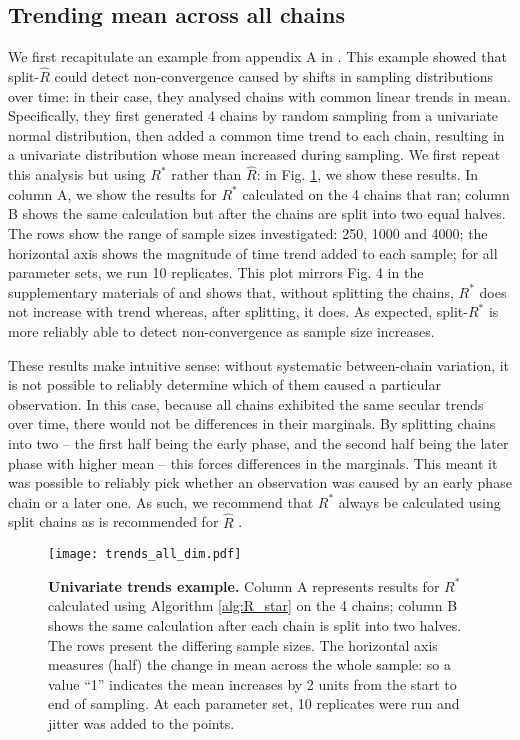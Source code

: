 \documentclass{article}
\begin{document}
\subsection{Trending mean across all chains}\label{sec:non-stationary_chains}
We first recapitulate an example from appendix A in \cite{vehtari2019rank}. This example showed that split-$\widehat{R}$ could detect non-convergence caused by shifts in sampling distributions over time: in their case, they analysed chains with common linear trends in mean. Specifically, they first generated 4 chains by random sampling from a univariate normal distribution, then added a common time trend to each chain, resulting in a univariate distribution whose mean increased during sampling. We first repeat this analysis but using $R^*$ rather than $\widehat{R}$: in Fig. \ref{fig:trends_all_dim}, we show these results. In column A, we show the results for $R^*$ calculated on the 4 chains that ran; column B shows the same calculation but after the chains are split into two equal halves. The rows show the range of sample sizes investigated: 250, 1000 and 4000; the horizontal axis shows the magnitude of time trend added to each sample; for all parameter sets, we run 10 replicates. This plot mirrors Fig. 4 in the supplementary materials of \cite{vehtari2019rank} and shows that, without splitting the chains, $R^*$ does not increase with trend whereas, after splitting, it does. As expected, split-$R^*$ is more reliably able to detect non-convergence as sample size increases.

These results make intuitive sense: without systematic between-chain variation, it is not possible to reliably determine which of them caused a particular observation. In this case, because all chains exhibited the same secular trends over time, there would not be differences in their marginals. By splitting chains into two -- the first half being the early phase, and the second half being the later phase with higher mean -- this forces differences in the marginals. This meant it was possible to reliably pick whether an observation was caused by an early phase chain or a later one. As such, we recommend that $R^*$ always be calculated using split chains as is recommended for $\widehat{R}$ \citep{carpenter2017stan,vehtari2019rank}.

\begin{figure}[!htb]
	\centerline{\texttt{[image: trends\_all\_dim.pdf]}}
	\caption{\textbf{Univariate trends example.} Column A represents results for $R^*$ calculated using Algorithm \ref{alg:R_star} on the 4 chains; column B  shows the same calculation after each chain is split into two halves. The rows present the differing sample sizes. The horizontal axis measures (half) the change in mean across the whole sample: so a value ``1'' indicates the mean increases by 2 units from the start to end of sampling. At each parameter set, 10 replicates were run and jitter was added to the points.}
	\label{fig:trends_all_dim}
\end{figure}
\end{document}
